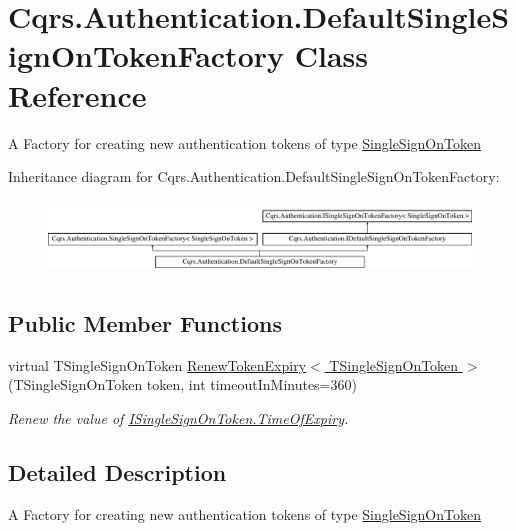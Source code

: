 \hypertarget{classCqrs_1_1Authentication_1_1DefaultSingleSignOnTokenFactory}{}\section{Cqrs.\+Authentication.\+Default\+Single\+Sign\+On\+Token\+Factory Class Reference}
\label{classCqrs_1_1Authentication_1_1DefaultSingleSignOnTokenFactory}


A Factory for creating new authentication tokens of type \hyperlink{classCqrs_1_1Authentication_1_1SingleSignOnToken}{Single\+Sign\+On\+Token}  


Inheritance diagram for Cqrs.\+Authentication.\+Default\+Single\+Sign\+On\+Token\+Factory\+:\begin{figure}[H]
\begin{center}
\leavevmode
\includegraphics[height=1.967213cm]{classCqrs_1_1Authentication_1_1DefaultSingleSignOnTokenFactory}
\end{center}
\end{figure}
\subsection*{Public Member Functions}
\begin{DoxyCompactItemize}
\item 
virtual T\+Single\+Sign\+On\+Token \hyperlink{classCqrs_1_1Authentication_1_1DefaultSingleSignOnTokenFactory_a1bb480afd0a467461b0db59da641fe29_a1bb480afd0a467461b0db59da641fe29}{Renew\+Token\+Expiry$<$ T\+Single\+Sign\+On\+Token $>$} (T\+Single\+Sign\+On\+Token token, int timeout\+In\+Minutes=360)
\begin{DoxyCompactList}\small\item\em Renew the value of \hyperlink{interfaceCqrs_1_1Authentication_1_1ISingleSignOnToken_a50af484569cc78f88acb01f1938a7cd8_a50af484569cc78f88acb01f1938a7cd8}{I\+Single\+Sign\+On\+Token.\+Time\+Of\+Expiry}. \end{DoxyCompactList}\end{DoxyCompactItemize}


\subsection{Detailed Description}
A Factory for creating new authentication tokens of type \hyperlink{classCqrs_1_1Authentication_1_1SingleSignOnToken}{Single\+Sign\+On\+Token} 



